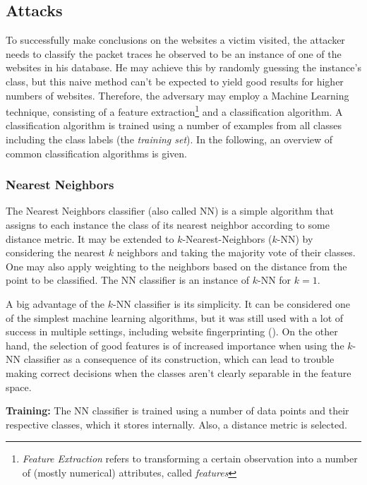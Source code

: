 \documentclass[
	ruledheaders=chapter,
	class=report,
	thesis={type=master, department=inf},
	accentcolor=1c,
	custommargins=true,
	marginpar=false,
	parskip=half-,
	fontsize=11pt,
]{tudapub}
\begin{document}
	
	\subsection{Attacks}
	\label{theoretical:attacks}
	
	To successfully make conclusions on the websites a victim visited, the attacker needs to classify the packet traces he observed to be an instance of one of the websites in his database. He may achieve this by randomly guessing the instance's class, but this naive method can't be expected to yield good results for higher numbers of websites. Therefore, the adversary may employ a Machine Learning technique, consisting of a feature extraction\footnote{\textit{Feature Extraction} refers to transforming a certain observation into a number of (mostly numerical) attributes, called \textit{features}} and a classification algorithm. A classification algorithm is trained using a number of examples from all classes including the class labels (the \textit{training set}). In the following, an overview of common classification algorithms is given.
	
	\subsubsection{Nearest Neighbors}
	\label{ml:nn}
	
	The Nearest Neighbors classifier (also called NN) is a simple algorithm that assigns to each instance the class of its nearest neighbor according to some distance metric. It may be extended to $k$-Nearest-Neighbors ($k$-NN) by considering the nearest $k$ neighbors and taking the majority vote of their classes. One may also apply weighting to the neighbors based on the distance from the point to be classified. The NN classifier is an instance of $k$-NN for $k = 1$.
	
	A big advantage of the $k$-NN classifier is its simplicity. It can be considered one of the simplest machine learning algorithms, but it was still used with a lot of success in multiple settings, including website fingerprinting (\cite{Wang2014}). On the other hand, the selection of good features is of increased importance when using the $k$-NN classifier as a consequence of its construction, which can lead to trouble making correct decisions when the classes aren't clearly separable in the feature space.
	
	\textbf{Training:} The NN classifier is trained using a number of data points and their respective classes, which it stores internally. Also, a distance metric is selected.
	
\end{document}
